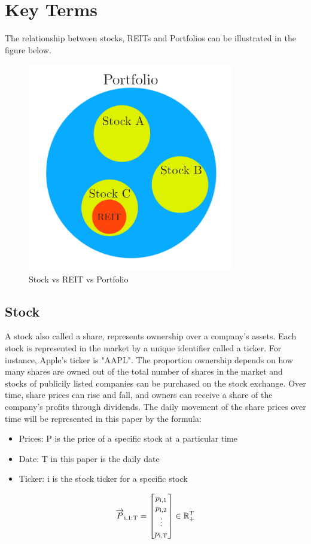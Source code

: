 \documentclass[a4paper,12pt]{report}
\numberwithin{equation}{section}
\theoremstyle{definition}
\begin{document}
\section{Key Terms}
The relationship between stocks, REITs and Portfolios can be illustrated in the figure below.
\begin{figure}[H]
  \centerline{\includegraphics[width=9cm]{Stock_Porfolio_Reit}}
  \caption{Stock vs REIT vs Portfolio}
  \label{fig:Stock_Porfolio_Reit}
  \end{figure}
\subsection{Stock}
A stock also called a share, represents ownership over a company's assets. Each stock is represented in the market by a unique identifier called a ticker. For instance, Apple's ticker is "AAPL". The proportion ownership depends on how many shares are owned out of the total number of shares in the market and stocks of publicily listed companies can be purchased on the stock exchange. Over time, share prices can rise and fall, and owners can receive a share of the company's profits through dividends. The daily movement of the share prices over time will be represented in this paper by the formula:

\begin{itemize}

  \item {Prices: P is the price of a specific stock at a particular time}
  \item {Date: T in this paper is the daily date}
  \item {Ticker: i is the stock ticker for a specific stock}
  
\end{itemize}
\begin{equation*}
  \overrightarrow{P}\textsubscript{i,1:T} =  
  \begin{bmatrix}
    p\textsubscript{i,1} \\
    p\textsubscript{i,2} \\
    \vdots \\
    p\textsubscript{i,T} \\
  \end{bmatrix}
  \in \mathbb{R}_+^{T}
\end{equation*}
\end{document}
